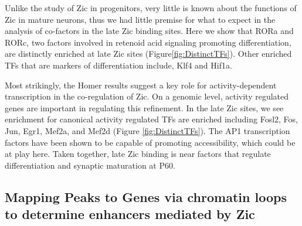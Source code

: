 \documentclass[fleqn,10pt]{wlscirep}
\begin{document}
Unlike the study of Zic in progenitors, very little is known about the functions of Zic in mature neurons, thus we had little premise for what to expect in the analysis of co-factors in the late Zic binding sites.  Here we show that RORa and RORc, two factors involved in retenoid acid signaling promoting differentiation, are distinctly enriched at late Zic sites (Figure\ref{fig:DistinctTFs}). Other enriched TFs that are markers of differentiation include, Klf4 and Hif1a\cite{}. 

Most strikingly, the Homer results suggest a key role for activity-dependent transcription in the co-regulation of Zic. On a genomic level, activity regulated genes are important in regulating this refinement. In the late Zic sites, we see enrichment for canonical activity regulated TFs are enriched  including Fosl2, Fos, Jun, Egr1, Mef2a, and Mef2d (Figure \ref{fig:DistinctTFs}). The AP1 transcription factors have been shown to be capable of promoting accessibility, which could be at play here.  Taken together, late Zic binding is near factors that regulate differentiation and synaptic maturation at P60. 



\subsection*{Mapping Peaks to Genes via chromatin loops to determine enhancers mediated by Zic}
\end{document}

